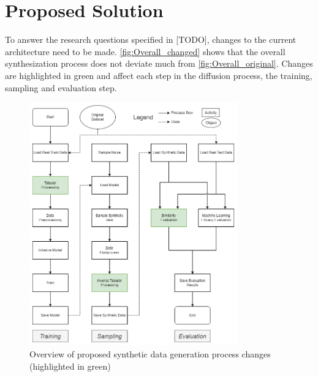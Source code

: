 \section{Proposed Solution}
\label{ch:conceptualDesign-changes}

To answer the research questions specified in [TODO], changes to the current architecture need to be made.
\autoref{fig:Overall_changed} shows that the overall synthesization process does not deviate much from \autoref{fig:Overall_original}.
Changes are highlighted in green and affect each step in the diffusion process, the training, sampling and evaluation step.

\begin{figure}[h]
    \centering
    \includegraphics[width=0.8\textwidth]{images/Overall_changed.png}
    \caption{Overview of proposed synthetic data generation process changes (highlighted in green)}
    \label{fig:Overall_changed}
\end{figure}


